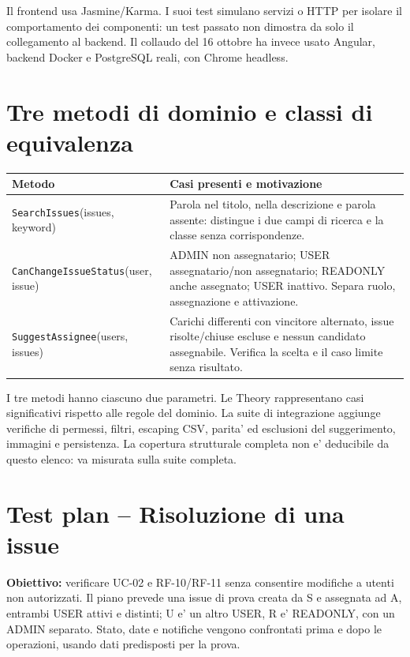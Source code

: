 \documentclass[11pt,a4paper,oneside]{report}
\begin{document}
Il frontend usa Jasmine/Karma. I suoi test simulano servizi o HTTP per
isolare il comportamento dei componenti: un test passato non dimostra
da solo il collegamento al backend. Il collaudo del 16 ottobre ha invece
usato Angular, backend Docker e PostgreSQL reali, con Chrome headless.

\section{Tre metodi di dominio e classi di equivalenza}
\begin{longtable}{P{0.29\textwidth} P{0.64\textwidth}}
\toprule Metodo & Casi presenti e motivazione\\\midrule\endhead
\texttt{SearchIssues}\newline(issues, keyword) & Parola nel titolo, nella descrizione e parola assente: distingue i due campi di ricerca e la classe senza corrispondenze.\\
\texttt{CanChangeIssueStatus}\newline(user, issue) & ADMIN non assegnatario; USER assegnatario/non assegnatario; READONLY anche assegnato; USER inattivo. Separa ruolo, assegnazione e attivazione.\\
\texttt{SuggestAssignee}\newline(users, issues) & Carichi differenti con vincitore alternato, issue risolte/chiuse escluse e nessun candidato assegnabile. Verifica la scelta e il caso limite senza risultato.\\
\bottomrule
\end{longtable}
I tre metodi hanno ciascuno due parametri. Le Theory rappresentano casi
significativi rispetto alle regole del dominio. La suite di integrazione aggiunge
verifiche di permessi, filtri, escaping CSV, parita' ed esclusioni del
suggerimento, immagini e persistenza. La copertura strutturale completa
non e' deducibile da questo elenco: va misurata sulla suite completa.


\section{Test plan -- Risoluzione di una issue}
\textbf{Obiettivo:} verificare UC-02 e RF-10/RF-11 senza consentire
modifiche a utenti non autorizzati. Il piano prevede una issue di prova
creata da S e assegnata ad A, entrambi USER attivi e distinti; U e' un altro
USER, R e' READONLY, con un ADMIN separato. Stato, date e notifiche vengono
confrontati prima e dopo le operazioni, usando dati predisposti per la prova.

\end{document}
